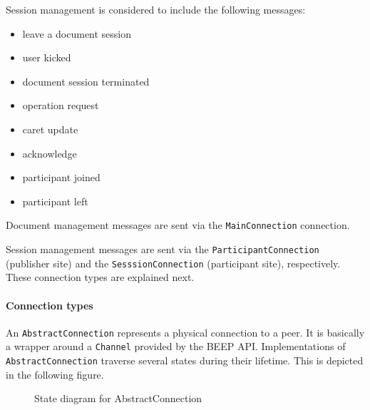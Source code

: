 Session management is considered to include the following messages:
\begin{itemize}
\item leave a document session
\item user kicked
\item document session terminated
\item operation request
\item caret update 
\item acknowledge
\item participant joined
\item participant left
\end{itemize}

Document management messages are sent via the \texttt{MainConnection} connection.

Session management messages are sent via the \texttt{ParticipantConnection} (publisher site) and the \texttt{SesssionConnection} (participant site), respectively. These connection types are explained next.

\paragraph{Connection types}
An \texttt{AbstractConnection} represents a physical connection to a peer. It is basically a wrapper around a \texttt{Channel} provided by the BEEP API. Implementations of \texttt{AbstractConnection} traverse several states during their lifetime. This is depicted in the following figure.

\begin{figure}[H]
 \centering
 \caption{State diagram for AbstractConnection}
 \label{fig:network.discovery.connection.state}
\end{figure}

